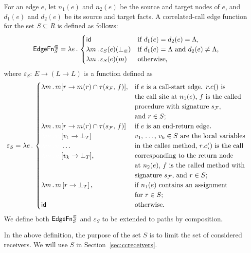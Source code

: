 \begin{definition}\label{def:edgefn}
  For an edge $e$, let $n_1(e)$ and $n_2(e)$ be the source and target nodes of $e$, and $d_1(e)$ and $d_2(e)$ be its source and target facts. A correlated-call edge function for the set $S\subseteq R$ is defined as follows:
  \begin{equation}\label{eq:edgefndef}
    \textsf{EdgeFn}^\Subset_{S}=\lambda e\,.\,
        \begin{cases}
          \textsf{id}  &\text{if $d_1(e)=d_2(e)=\Lambda$},\\
          \lambda m\,.\,\varepsilon_S(e)(\bot_\Subset) &\text{if $d_1(e)=\Lambda$ and $d_2(e)\ne\Lambda$},\\
          \lambda m\,.\,\varepsilon_S(e)(m)  &\text{otherwise,}
        \end{cases}
  \end{equation}
  where $\varepsilon_S:\,E\to(L\to L)$ is a function defined as
  \begin{equation}\label{eq:varepsilon}
    \varepsilon_S=\lambda e\,.\,
        \begin{cases}
            \lambda m\,.\,m[r\to m(r)\cap \tau(s_\mathcal F,\,f)],
                &\text{if $e$ is a call-start edge. $r.c()$ is}\\
                &\text{the call site at $n_1(e)$, $f$ is the called}\\
                &\text{procedure with signature $s_\mathcal F$,}\\
                &\text{and $r\in S$;}\\
            \lambda m\,.\,m[r\to m(r)\cap \tau(s_\mathcal F,\,f)]
                &\text{if $e$ is an end-return edge.}\\
            \textcolor{white}{\lambda m\,.\,m}[v_1\to\bot_T]
                &\text{$v_1,\,\dots,\,v_k\in S$ are the local variables}\\
            \textcolor{white}{\lambda m\,.\,m}\dots
                &\text{in the callee method, $r.c()$ is the call}\\
            \textcolor{white}{\lambda m\,.\,m}[v_k\to\bot_T],
                &\text{corresponding to the return node}\\
                &\text{at $n_2(e)$, $f$ is the called method with}\\
                &\text{signature $s_\mathcal F$, and $r\in S$;}\\
            \lambda m\,.\,m\left[r\to \bot_T\right],
                &\text{if $n_1(e)$ contains an assignment}\\
                &\text{for $r\in S$;}\\
            \id
                &\text{otherwise.}
        \end{cases}
  \end{equation}
  We define both $\textsf{EdgeFn}^\Subset_{S}$ and $\varepsilon_S$ to be extended to paths by composition.
\end{definition}
In the above definition, the purpose of the set $S$ is to limit the set of considered receivers. We will use $S$ in Section~\ref{sec:ccreceivers}.

